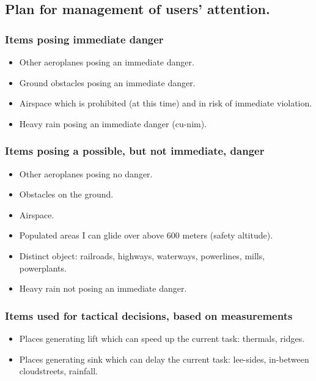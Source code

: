 \documentclass{article}
\begin{document}
\subsection{Plan for management of users' attention.}

\subsubsection{Items posing immediate danger}
\begin{itemize}
\item Other aeroplanes posing an immediate danger.
\item Ground obstacles posing an immediate danger.
\item Airspace which is prohibited (at this time) and in risk of immediate violation.
\item Heavy rain posing an immediate danger (cu-nim).
\end{itemize}

\subsubsection{Items posing a possible, but not immediate, danger}
\begin{itemize}
\item Other aeroplanes posing no danger.
\item Obstacles on the ground.
\item Airspace.
\item Populated areas I can glide over above 600 meters (safety altitude).
\item Distinct object: railroads, highways, waterways, powerlines, mills, powerplants.
\item Heavy rain not posing an immediate danger.
\end{itemize}

\subsubsection{Items used for tactical decisions, based on measurements}
\begin{itemize}
\item Places generating lift which can speed up the current task: thermals, ridges.
\item Places generating sink which can delay the current task: lee-sides, in-between cloudstreets, rainfall.
\end{itemize}
\end{document}
